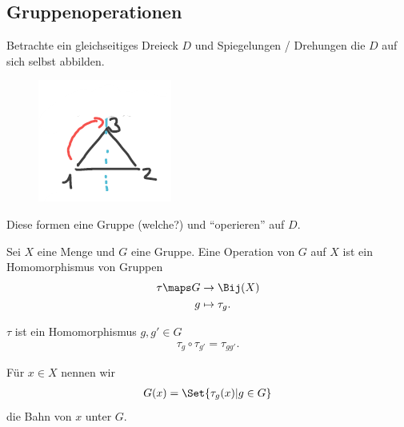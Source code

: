 \subsection*{Gruppenoperationen}
\begin{beispiel}\label{d_3}
    Betrachte ein gleichseitiges Dreieck \( D \) und Spiegelungen / Drehungen die \( D \) auf sich selbst abbilden.

    \begin{figure}[H]
        \centering
        \includegraphics[width=0.2\linewidth]{figures/d_3}
        \label{fig:d_3}
    \end{figure}
    Diese formen eine Gruppe (welche?) und \enquote{operieren} auf \( D \).
\end{beispiel}
\begin{definition}
    Sei \( X \) eine Menge und \( G \) eine Gruppe. 
    Eine Operation von \( G \) auf \( X \) ist ein Homomorphismus von Gruppen
    \begin{align*}
        \tau\maps \begin{aligned}[t] 
            G&\to \Bij(X)\\
            g&\mapsto \tau_g.
        \end{aligned}
    \end{align*}
\end{definition}
\begin{bemerkung*}
    \( \tau \) ist ein Homomorphismus \dh \tforall \( g, g' \in G \)
    \begin{align*}
        \tau_g\circ \tau_{g'}=\tau_{gg'}.
    \end{align*}
    
    Für \( x\in X \) nennen wir
    \begin{align*}
        G(x)=\Set{\tau_g(x)|g\in G}
    \end{align*}
    die Bahn von \( x \) unter \( G \).
\end{bemerkung*}
